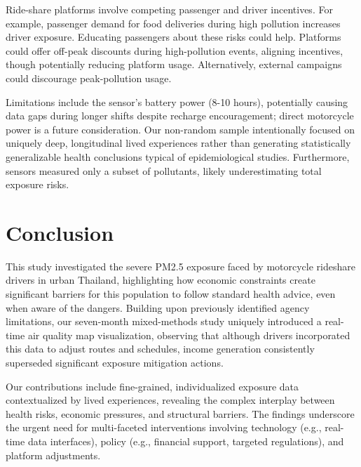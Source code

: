 \documentclass[sigconf,screen,natbib=true]{acmart}
\begin{document}
Ride-share platforms involve competing passenger and driver incentives.
For example, passenger demand for food deliveries during high pollution increases driver exposure.
Educating passengers about these risks could help.
Platforms could offer off-peak discounts during high-pollution events, aligning incentives, though potentially reducing platform usage.
Alternatively, external campaigns could discourage peak-pollution usage.















Limitations include the sensor's battery power (8-10 hours), potentially causing data gaps during longer shifts despite recharge encouragement; direct motorcycle power is a future consideration.
Our non-random sample intentionally focused on uniquely deep, longitudinal lived experiences rather than generating statistically generalizable health conclusions typical of epidemiological studies.
Furthermore, sensors measured only a subset of pollutants, likely underestimating total exposure risks. \section{Conclusion}


This study investigated the severe PM2.5 exposure faced by motorcycle rideshare drivers in urban Thailand, 
highlighting how economic constraints create significant barriers for this population to follow standard health advice, even when aware of the dangers.
Building upon previously identified agency limitations, our seven-month mixed-methods study uniquely introduced a real-time air quality map visualization,
observing that although drivers incorporated this data to adjust routes and schedules,
income generation consistently superseded significant exposure mitigation actions.


Our contributions include fine-grained, individualized exposure data contextualized by lived experiences, revealing the complex interplay between health risks, economic pressures, and structural barriers.
The findings underscore the urgent need for multi-faceted interventions involving technology (e.g., real-time data interfaces), policy (e.g., financial support, targeted regulations), and platform adjustments.
%



\end{document}
